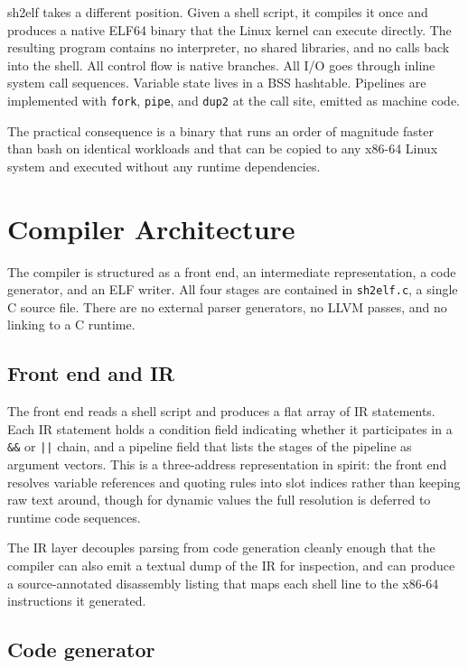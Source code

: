 \documentclass[10pt,twocolumn]{article}
\begin{document}
sh2elf takes a different position. Given a shell script, it compiles
it once and produces a native ELF64 binary that the Linux kernel can
execute directly. The resulting program contains no interpreter, no
shared libraries, and no calls back into the shell. All control flow
is native branches. All I/O goes through inline system call sequences.
Variable state lives in a BSS hashtable. Pipelines are implemented
with \texttt{fork}, \texttt{pipe}, and \texttt{dup2} at the call site,
emitted as machine code.

The practical consequence is a binary that runs an order of magnitude
faster than bash on identical workloads and that can be copied to any
x86-64 Linux system and executed without any runtime dependencies.


\section{Compiler Architecture}

The compiler is structured as a front end, an intermediate
representation, a code generator, and an ELF writer. All four stages
are contained in \texttt{sh2elf.c}, a single C source file. There are
no external parser generators, no LLVM passes, and no linking to a C
runtime.

\subsection{Front end and IR}

The front end reads a shell script and produces a flat array of IR
statements. Each IR statement holds a condition field indicating
whether it participates in a \texttt{\&\&} or \texttt{||} chain, and a
pipeline field that lists the stages of the pipeline as argument
vectors. This is a three-address representation in spirit: the front
end resolves variable references and quoting rules into slot indices
rather than keeping raw text around, though for dynamic values the
full resolution is deferred to runtime code sequences.

The IR layer decouples parsing from code generation cleanly enough
that the compiler can also emit a textual dump of the IR for
inspection, and can produce a source-annotated disassembly listing
that maps each shell line to the x86-64 instructions it generated.

\subsection{Code generator}
\end{document}
